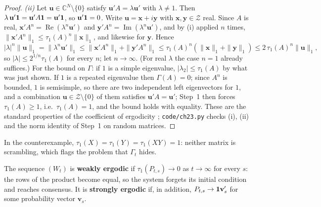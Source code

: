 \documentclass[../structural_economics_book.tex]{subfiles}
\begin{document}
\begin{proof}
\emph{(ii)} Let $\mathbf{u} \in \mathbb{C}^N\setminus\{0\}$ satisfy $\mathbf{u}'A = \lambda\mathbf{u}'$ with $\lambda \ne 1$. Then $\lambda\,\mathbf{u}'\mathbf{1} = \mathbf{u}'A\mathbf{1} = \mathbf{u}'\mathbf{1}$, so $\mathbf{u}'\mathbf{1} = 0$. Write $\mathbf{u} = \mathbf{x} + i\mathbf{y}$ with $\mathbf{x}, \mathbf{y} \in \mathcal{Z}$ real. Since $A$ is real, $\mathbf{x}'A^n = \operatorname{Re}(\lambda^n\mathbf{u}')$ and $\mathbf{y}'A^n = \operatorname{Im}(\lambda^n\mathbf{u}')$, and by (i) applied $n$ times, $\|\mathbf{x}'A^n\|_1 \le \tau_1(A)^n\|\mathbf{x}\|_1$, and likewise for $\mathbf{y}$. Hence
\[
|\lambda|^n\|\mathbf{u}\|_1 = \|\lambda^n\mathbf{u}'\|_1 \le \|\mathbf{x}'A^n\|_1 + \|\mathbf{y}'A^n\|_1 \le \tau_1(A)^n(\|\mathbf{x}\|_1 + \|\mathbf{y}\|_1) \le 2\,\tau_1(A)^n\|\mathbf{u}\|_1,
\]
so $|\lambda| \le 2^{1/n}\tau_1(A)$ for every $n$; let $n \to \infty$. (For real $\lambda$ the case $n = 1$ already suffices.) For the bound on $\Gamma$: if $1$ is a simple eigenvalue, $|\lambda_2| \le \tau_1(A)$ by what was just shown. If $1$ is a repeated eigenvalue then $\Gamma(A) = 0$; since $A^n$ is bounded, $1$ is semisimple, so there are two independent left eigenvectors for $1$, and a combination $\mathbf{u} \in \mathcal{Z}\setminus\{0\}$ of them satisfies $\mathbf{u}'A = \mathbf{u}'$; Step~1 then forces $\tau_1(A) \ge 1$, i.e.\ $\tau_1(A) = 1$, and the bound holds with equality. These are the standard properties of the coefficient of ergodicity \citep[Sect.~4.3]{seneta2006nonnegative}; \texttt{code/ch23.py} checks (i), (ii) and the norm identity of Step~1 on random matrices.
\end{proof}

In the counterexample, $\tau_1(X) = \tau_1(Y) = \tau_1(XY) = 1$: neither matrix is scrambling, which flags the problem that $\Gamma_t$ hides.

\begin{definition}\label{ch23:def:ergodicity}
The sequence $(W_t)$ is \textbf{weakly ergodic} if $\tau_1(P_{t,s}) \to 0$ as $t \to \infty$ for every $s$: the rows of the product become equal, so the system forgets its initial condition and reaches consensus. It is \textbf{strongly ergodic} if, in addition, $P_{t,s} \to \mathbf{1}\mathbf{v}_s'$ for some probability vector $\mathbf{v}_s$.
\end{definition}
\end{document}
